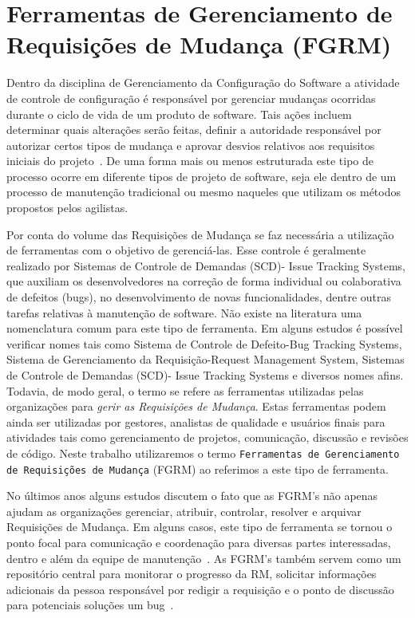\section{Ferramentas de Gerenciamento de Requisições de Mudança (FGRM)}
\label{sec:ferramentas_de_gerenciameto_de_requisições_de_mudança}

Dentro da disciplina de Gerenciamento da Configuração do Software a atividade de
controle de configuração é responsável por gerenciar mudanças ocorridas durante
o ciclo de vida de um produto de software. Tais ações incluem determinar quais
alterações serão feitas, definir a autoridade responsável por autorizar certos
tipos de mudança e aprovar desvios relativos aos requisitos iniciais do
projeto~\cite{4425813}. De uma forma mais ou menos estruturada este tipo de
processo ocorre em diferente tipos de projeto de software, seja ele dentro de um
processo de manutenção tradicional ou mesmo naqueles que utilizam os métodos
propostos pelos agilistas.

Por conta do volume das Requisições de Mudança se faz necessária a utilização de
ferramentas com o objetivo de gerenciá-las. Esse controle é geralmente realizado
por Sistemas de Controle de Demandas (SCD)- Issue Tracking Systems, que auxiliam
os desenvolvedores na correção de forma individual ou colaborativa de defeitos
(bugs), no desenvolvimento de novas funcionalidades, dentre outras tarefas
relativas à manutenção de software. Não existe na literatura uma nomenclatura
comum para este tipo de ferramenta. Em alguns estudos é possível verificar nomes
tais como Sistema de Controle de Defeito\@-\@ Bug Tracking Systems, Sistema de
Gerenciamento da Requisição\@-\@ Request Management System, Sistemas de Controle de
Demandas (SCD)- Issue Tracking Systems e diversos nomes afins. Todavia, de modo
geral, o termo se refere as ferramentas utilizadas pelas organizações para
\textit{gerir as Requisições de Mudança}. Estas ferramentas podem ainda ser
utilizadas por gestores, analistas de qualidade e usuários finais para
atividades tais como gerenciamento de projetos, comunicação, discussão e
revisões de código. Neste trabalho utilizaremos o termo \texttt{Ferramentas de
	Gerenciamento de Requisições de Mudança} (FGRM) ao referimos a este tipo de
ferramenta.

No últimos anos alguns estudos discutem o fato que as FGRM's não apenas ajudam
as organizações gerenciar, atribuir, controlar, resolver e arquivar Requisições
de Mudança. Em alguns casos, este tipo de ferramenta se tornou o ponto focal
para comunicação e coordenação para diversas partes interessadas, dentro e além
da equipe de manutenção~\cite{Bertram:2010:CCB:1718918.1718972}.  As FGRM's
também servem como um repositório central para monitorar o progresso da RM,
solicitar informações adicionais da pessoa responsável por redigir a requisição
e o ponto de discussão para potenciais soluções um
bug~\cite{zimmermann2009improving}.

